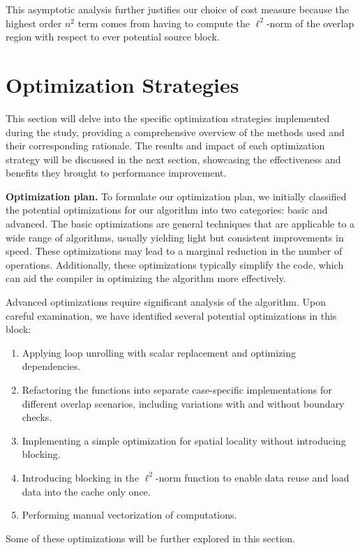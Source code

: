 \documentclass[letterpaper]{article}
\newcommand{\mypar}[1]{{\bf #1.}}
\begin{document}
This asymptotic analysis further justifies our choice of cost measure because the highest order $n^2$ term comes from having to compute the $\ell ^2$-norm of the overlap region with respect to ever potential source block.

\section{Optimization Strategies}\label{sec:yourmethod}

 This section will delve into the specific optimization strategies implemented during the study, providing a comprehensive overview of the methods used and their corresponding rationale. The results and impact of each optimization strategy will be discussed in the next section, showcasing the effectiveness and benefits they brought to performance improvement.

\mypar{Optimization plan} 
To formulate our optimization plan, we initially classified the potential optimizations for our algorithm into two categories: basic and advanced. The basic optimizations are general techniques that are applicable to a wide range of algorithms, usually yielding light but consistent improvements in speed. These optimizations may lead to a marginal reduction in the number of operations. Additionally, these optimizations typically simplify the code, which can aid the compiler in optimizing the algorithm more effectively.

Advanced optimizations require significant analysis of the algorithm. Upon careful examination, we have identified several potential optimizations in this block:

\begin{enumerate}
\item Applying loop unrolling with scalar replacement and optimizing dependencies.
\item Refactoring the functions into separate case-specific implementations for different overlap scenarios, including variations with and without boundary checks.
\item Implementing a simple optimization for spatial locality without introducing blocking.
\item Introducing blocking in the $\ell ^2$-norm function to enable data reuse and load data into the cache only once.
\item Performing manual vectorization of computations.
\end{enumerate}

Some of these optimizations will be further explored in this section.
\end{document}
